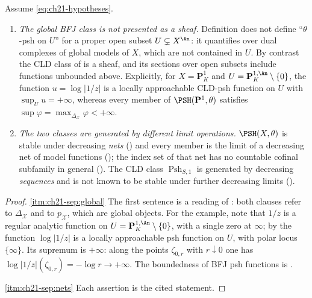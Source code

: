 \begin{proposition}
\label{prop:ch21-bfj-vs-cld}
Assume \eqref{eq:ch21-hypotheses}.
\begin{enumerate}
\item\label{itm:ch21-sep:global}
\emph{The global BFJ class is not presented as a sheaf.}  Definition
 does not define ``$\theta$-psh on $U$'' for a
proper open subset $U\subsetneq X^{\An}$: it quantifies over dual
complexes of global models of $X$, which are not contained in $U$.  By
contrast the CLD class of  is a sheaf, and its
sections over open subsets include functions unbounded above.  Explicitly,
for $X=\mathbf P^1_K$ and $U=\mathbf P^{1,\An}_K\setminus\{0\}$, the
function $u=\log|1/z|$ is a locally approachable CLD-psh function on
$U$ with $\sup_Uu=+\infty$, whereas every member of
$\PSH(\mathbf P^1,\theta)$ satisfies
$\sup\varphi=\max_{\Delta_{\mathcal X}}\varphi<+\infty$.
\item\label{itm:ch21-sep:nets}
\emph{The two classes are generated by different limit operations.}
$\PSH(X,\theta)$ is stable under decreasing \emph{nets}
() and every member is the limit of a
decreasing net of model functions
(); the index set of that net has no
countable cofinal subfamily in general
().  The CLD class
$\operatorname{Psh}_{S,1}$ is generated by decreasing \emph{sequences} and
is not known to be stable under further decreasing limits
().
\end{enumerate}
\end{proposition}

\begin{proof}
\cref{itm:ch21-sep:global}  The first sentence is a reading of
: both clauses refer to $\Delta_{\mathcal X}$ and
to $p_{\mathcal X}$, which are global objects.  For the example, note that
$1/z$ is a regular analytic function on
$U=\mathbf P^{1,\An}_K\setminus\{0\}$, with a single zero at $\infty$;
by  the function $\log|1/z|$ is a
locally approachable psh function on $U$, with polar locus
$\{\infty\}$.  Its supremum is $+\infty$: along the points
$\zeta_{0,r}$ with $r\downarrow0$ one has
$\log|1/z|(\zeta_{0,r})=-\log r\to+\infty$.  The boundedness of BFJ psh
functions is .

\cref{itm:ch21-sep:nets}  Each assertion is the cited statement.
\end{proof}

